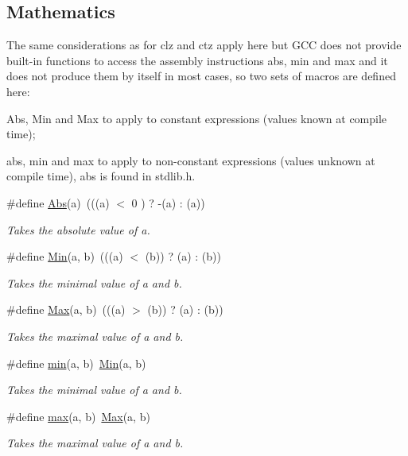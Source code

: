 \subsection*{Mathematics}
\label{_amgrp540b21ecdb276f5087ee585cedd6d5d0}%
The same considerations as for clz and ctz apply here but G\+C\+C does not provide built-\/in functions to access the assembly instructions abs, min and max and it does not produce them by itself in most cases, so two sets of macros are defined here\+:
\begin{DoxyItemize}
\item Abs, Min and Max to apply to constant expressions (values known at compile time);
\item abs, min and max to apply to non-\/constant expressions (values unknown at compile time), abs is found in stdlib.\+h. 
\end{DoxyItemize}\begin{DoxyCompactItemize}
\item 
\#define \hyperlink{group__group__sam0__utils_gae56b0282c58a65969c092e1eeeedd6f5}{Abs}(a)~(((a) $<$  0 ) ? -\/(a) \+: (a))
\begin{DoxyCompactList}\small\item\em Takes the absolute value of {\itshape a}. \end{DoxyCompactList}\item 
\#define \hyperlink{group__group__sam0__utils_ga9e04209162ea72f9985338596262b657}{Min}(a,  b)~(((a) $<$ (b)) ?  (a) \+: (b))
\begin{DoxyCompactList}\small\item\em Takes the minimal value of {\itshape a} and {\itshape b}. \end{DoxyCompactList}\item 
\#define \hyperlink{group__group__sam0__utils_ga4886a8f966a69949cefc46a6a3468006}{Max}(a,  b)~(((a) $>$ (b)) ?  (a) \+: (b))
\begin{DoxyCompactList}\small\item\em Takes the maximal value of {\itshape a} and {\itshape b}. \end{DoxyCompactList}\item 
\#define \hyperlink{group__group__sam0__utils_gac6afabdc09a49a433ee19d8a9486056d}{min}(a,  b)~\hyperlink{group__group__sam0__utils_ga9e04209162ea72f9985338596262b657}{Min}(a, b)
\begin{DoxyCompactList}\small\item\em Takes the minimal value of {\itshape a} and {\itshape b}. \end{DoxyCompactList}\item 
\#define \hyperlink{group__group__sam0__utils_gaffe776513b24d84b39af8ab0930fef7f}{max}(a,  b)~\hyperlink{group__group__sam0__utils_ga4886a8f966a69949cefc46a6a3468006}{Max}(a, b)
\begin{DoxyCompactList}\small\item\em Takes the maximal value of {\itshape a} and {\itshape b}. \end{DoxyCompactList}\end{DoxyCompactItemize}
